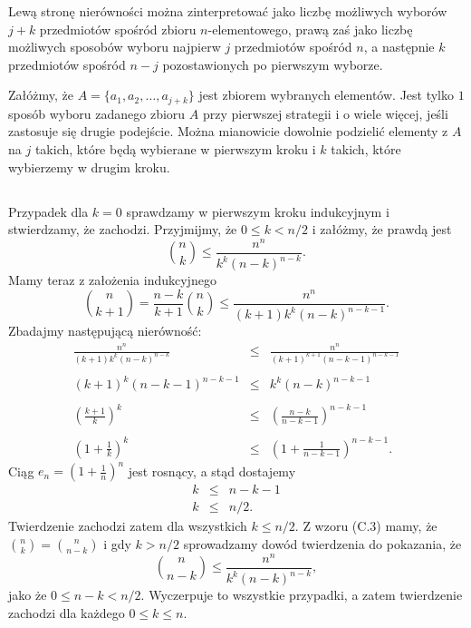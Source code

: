 Lewą stronę nierówności można zinterpretować jako liczbę możliwych wyborów $j+k$ przedmiotów spośród zbioru $n$-elementowego, prawą zaś jako liczbę możliwych sposobów wyboru najpierw $j$ przedmiotów spośród $n$, a następnie $k$ przedmiotów spośród $n-j$ pozostawionych po pierwszym wyborze.

Załóżmy, że $A=\{ a_1,a_2,\dots,a_{j+k}\}$ jest zbiorem wybranych elementów. Jest tylko $1$ sposób wyboru zadanego zbioru $A$ przy pierwszej strategii i o wiele więcej, jeśli zastosuje się drugie podejście. Można mianowicie dowolnie podzielić elementy z $A$ na $j$ takich, które będą wybierane w pierwszym kroku i $k$ takich, które wybierzemy w drugim kroku.

\subsection{} %
Przypadek dla $k=0$ sprawdzamy w pierwszym kroku indukcyjnym i stwierdzamy, że zachodzi. Przyjmijmy, że $0\le k<n/2$ i załóżmy, że prawdą jest
\[
	\binom{n}{k}\le\frac{n^n}{k^k(n-k)^{n-k}}.
\]
Mamy teraz z założenia indukcyjnego
\[
	\binom{n}{k+1} = \frac{n-k}{k+1}\binom{n}{k}\le\frac{n^n}{(k+1)k^k(n-k)^{n-k-1}}.
\]
Zbadajmy następującą nierówność:
\begin{eqnarray*}
	\frac{n^n}{(k+1)k^k(n-k)^{n-k}} &\le& \frac{n^n}{(k+1)^{k+1}(n-k-1)^{n-k-1}} \\\\
	(k+1)^k(n-k-1)^{n-k-1} &\le& k^k(n-k)^{n-k-1} \\\\
	\left(\frac{k+1}{k}\right)^k &\le& \left(\frac{n-k}{n-k-1}\right)^{n-k-1} \\\\
	\left(1+\frac{1}{k}\right)^k &\le& \left(1+\frac{1}{n-k-1}\right)^{n-k-1}.
\end{eqnarray*}
Ciąg $e_n=\left(1+\frac{1}{n}\right)^n$ jest rosnący, a stąd dostajemy
\begin{eqnarray*}
	k &\le& n-k-1 \\
	k &\le& n/2.
\end{eqnarray*}
Twierdzenie zachodzi zatem dla wszystkich $k\le n/2$. Z wzoru (C.3) mamy, że $\binom{n}{k}=\binom{n}{n-k}$ i gdy $k>n/2$ sprowadzamy dowód twierdzenia do pokazania, że
\[
	\binom{n}{n-k}\le\frac{n^n}{k^k(n-k)^{n-k}},
\]
jako że $0\le n-k<n/2$. Wyczerpuje to wszystkie przypadki, a zatem twierdzenie zachodzi dla każdego $0\le k\le n$.

